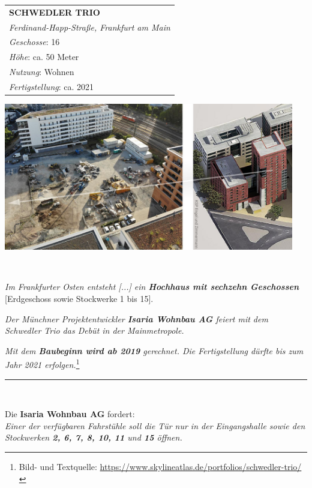 \documentclass[oneside,openany,headings=optiontotoc,11pt,numbers=noenddot]{scrreprt}
\begin{document}
	\begin{landscape}
		\thispagestyle{empty}
		\setlength{\leftskip}{-0.32cm}
		\begin{minipage}{0.35\textwidth}
			\renewcommand{\arraystretch}{1.5}
			\begin{tabularx}{\textwidth}{|X|}
				\hline
				\textbf{SCHWEDLER TRIO}\\
				\textit{Ferdinand-Happ-Straße, Frankfurt am Main}\\
				\textit{Geschosse}: 16\\
				\textit{Höhe}: ca. 50 Meter\\
				\textit{Nutzung}: Wohnen\\
				\textit{Fertigstellung}: ca. 2021\\
				\hline
			\end{tabularx}
		\end{minipage}
		\hfill
		\begin{minipage}{0.8\textwidth}
			\includegraphics[width=0.95\textwidth]{../99_Bilder/190219_Hochhaus.jpg}
		\end{minipage}\\
		\par\bigskip\noindent
		\textit{Im Frankfurter Osten entsteht [...] ein \textbf{Hochhaus mit sechzehn Geschossen}} [Erdgeschoss sowie Stockwerke 1 bis 15].\\
		\par\noindent
		\textit{Der Münchner Projektentwickler \textbf{Isaria Wohnbau AG} feiert mit dem Schwedler Trio das Debüt in der Mainmetropole.}\\
		\par\noindent
		\textit{Mit dem \textbf{Baubeginn wird ab 2019} gerechnet. Die Fertigstellung dürfte bis zum Jahr 2021 erfolgen.}\footnote{Bild- und Textquelle: \url{https://www.skylineatlas.de/portfolios/schwedler-trio/}}\\
		\par\noindent
		\rule{\textwidth}{0.1pt}\\
		\par\noindent
		Die \textbf{Isaria Wohnbau AG} fordert:\\
		\huge
		\grqq{}\textit{Einer der verfügbaren Fahrstühle soll die Tür nur in der Eingangshalle sowie den Stockwerken \textbf{2, 6, 7, 8, 10, 11} und \textbf{15} öffnen.}\grqq{}
	\end{landscape}
\end{document}
